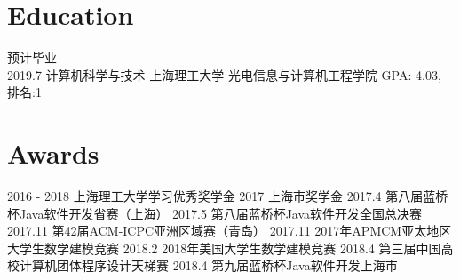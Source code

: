 \documentclass[letterpaper,UTF8]{twentysecondcv} %
\begin{document}
\makeprofile %

\section{Education}

\begin{twenty} %
	\twentyitem
    	{预计毕业 \\ 2019.7}
        {计算机科学与技术}
        {}
        {上海理工大学 光电信息与计算机工程学院}
        {GPA: 4.03, 排名:1}
\end{twenty}


\section{Awards}
\begin{twenty}
	\twentyitem
    	{2016 - 2018}
        {上海理工大学学习优秀奖学金}
        {\textbf{{}}}
        {}
        {}
    \twentyitem
        {2017}
        {上海市奖学金}
        {\textbf{{}}}
        {}
        {}
    \twentyitem
        {2017.4}
        {第八届蓝桥杯Java软件开发省赛（上海）}
        {\textbf{{}}}
        {}
        {}
    \twentyitem
        {2017.5}
        {第八届蓝桥杯Java软件开发全国总决赛}
        {\textbf{{}}}
        {}
        {}
    \twentyitem
        {2017.11}
        {第42届ACM-ICPC亚洲区域赛（青岛）}
        {\textbf{{}}}
        {}
        {}
    \twentyitem
        {2017.11}
        {2017年APMCM亚太地区大学生数学建模竞赛}
        {\textbf{{}}}
        {}
        {}
    \twentyitem
        {2018.2}
        {2018年美国大学生数学建模竞赛}
        {\textbf{{}}}
        {}
        {}
    \twentyitem
        {2018.4}
        {第三届中国高校计算机团体程序设计天梯赛}
        {\textbf{{}}}
        {}
        {}
    \twentyitem
        {2018.4}
        {第九届蓝桥杯Java软件开发上海市}
        {\textbf{{}}}
        {}
        {}
\end{twenty}
\end{document}
